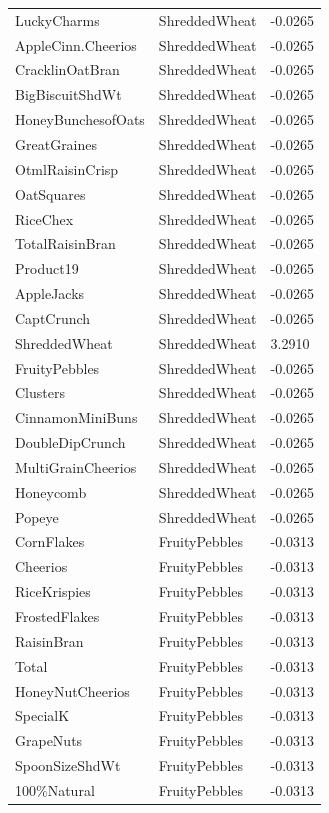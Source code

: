 \begin{table}[!htbp]
\begin{tabular}{lll}
LuckyCharms & ShreddedWheat & -0.0265
\\
AppleCinn.Cheerios & ShreddedWheat & -0.0265
\\
CracklinOatBran & ShreddedWheat & -0.0265
\\
BigBiscuitShdWt & ShreddedWheat & -0.0265
\\
HoneyBunchesofOats & ShreddedWheat & -0.0265
\\
GreatGraines & ShreddedWheat & -0.0265
\\
OtmlRaisinCrisp & ShreddedWheat & -0.0265
\\
OatSquares & ShreddedWheat & -0.0265
\\
RiceChex & ShreddedWheat & -0.0265
\\
TotalRaisinBran & ShreddedWheat & -0.0265
\\
Product19 & ShreddedWheat & -0.0265
\\
AppleJacks & ShreddedWheat & -0.0265
\\
CaptCrunch & ShreddedWheat & -0.0265
\\
ShreddedWheat & ShreddedWheat & 3.2910
\\
FruityPebbles & ShreddedWheat & -0.0265
\\
Clusters & ShreddedWheat & -0.0265
\\
CinnamonMiniBuns & ShreddedWheat & -0.0265
\\
DoubleDipCrunch & ShreddedWheat & -0.0265
\\
MultiGrainCheerios & ShreddedWheat & -0.0265
\\
Honeycomb & ShreddedWheat & -0.0265
\\
Popeye & ShreddedWheat & -0.0265
\\
CornFlakes & FruityPebbles & -0.0313
\\
Cheerios & FruityPebbles & -0.0313
\\
RiceKrispies & FruityPebbles & -0.0313
\\
FrostedFlakes & FruityPebbles & -0.0313
\\
RaisinBran & FruityPebbles & -0.0313
\\
Total & FruityPebbles & -0.0313
\\
HoneyNutCheerios & FruityPebbles & -0.0313
\\
SpecialK & FruityPebbles & -0.0313
\\
GrapeNuts & FruityPebbles & -0.0313
\\
SpoonSizeShdWt & FruityPebbles & -0.0313
\\
100\%Natural & FruityPebbles & -0.0313
\\

\end{tabular}
\end{table}
